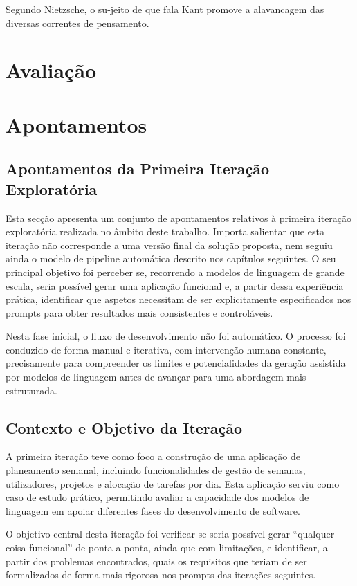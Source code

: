          Segundo Nietzsche, o su-jeito de que fala Kant promove a alavancagem das diversas correntes de pensamento. 


\chapter{Avaliação}

\chapter{Apontamentos}

\section{Apontamentos da Primeira Iteração Exploratória}

Esta secção apresenta um conjunto de apontamentos relativos à primeira iteração exploratória realizada no âmbito deste trabalho. Importa salientar que esta iteração não corresponde a uma versão final da solução proposta, nem seguiu ainda o modelo de pipeline automática descrito nos capítulos seguintes. O seu principal objetivo foi perceber se, recorrendo a modelos de linguagem de grande escala, seria possível gerar uma aplicação funcional e, a partir dessa experiência prática, identificar que aspetos necessitam de ser explicitamente especificados nos prompts para obter resultados mais consistentes e controláveis.

Nesta fase inicial, o fluxo de desenvolvimento não foi automático. O processo foi conduzido de forma manual e iterativa, com intervenção humana constante, precisamente para compreender os limites e potencialidades da geração assistida por modelos de linguagem antes de avançar para uma abordagem mais estruturada.

\section{Contexto e Objetivo da Iteração}

A primeira iteração teve como foco a construção de uma aplicação de planeamento semanal, incluindo funcionalidades de gestão de semanas, utilizadores, projetos e alocação de tarefas por dia. Esta aplicação serviu como caso de estudo prático, permitindo avaliar a capacidade dos modelos de linguagem em apoiar diferentes fases do desenvolvimento de software.

O objetivo central desta iteração foi verificar se seria possível gerar “qualquer coisa funcional” de ponta a ponta, ainda que com limitações, e identificar, a partir dos problemas encontrados, quais os requisitos que teriam de ser formalizados de forma mais rigorosa nos prompts das iterações seguintes.

